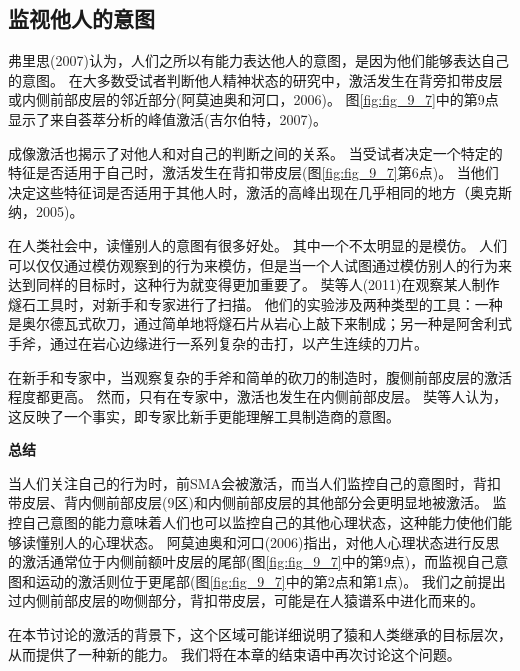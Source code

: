 \subsection{监视他人的意图}
\par
弗里思(2007)认为，人们之所以有能力表达他人的意图，是因为他们能够表达自己的意图。
在大多数受试者判断他人精神状态的研究中，激活发生在背旁扣带皮层或内侧前部皮层的邻近部分(阿莫迪奥和河口，2006)。
图\ref{fig:fig_9_7}中的第9点显示了来自荟萃分析的峰值激活(吉尔伯特，2007)。
\par


成像激活也揭示了对他人和对自己的判断之间的关系。
当受试者决定一个特定的特征是否适用于自己时，激活发生在背扣带皮层(图\ref{fig:fig_9_7}第6点)。
当他们决定这些特征词是否适用于其他人时，激活的高峰出现在几乎相同的地方（奥克斯纳，2005)。
\par


在人类社会中，读懂别人的意图有很多好处。
其中一个不太明显的是模仿。
人们可以仅仅通过模仿观察到的行为来模仿，但是当一个人试图通过模仿别人的行为来达到同样的目标时，这种行为就变得更加重要了。
奘等人(2011)在观察某人制作燧石工具时，对新手和专家进行了扫描。
他们的实验涉及两种类型的工具：一种是奥尔德瓦式砍刀，通过简单地将燧石片从岩心上敲下来制成；另一种是阿舍利式手斧，通过在岩心边缘进行一系列复杂的击打，以产生连续的刀片。
\par


在新手和专家中，当观察复杂的手斧和简单的砍刀的制造时，腹侧前部皮层的激活程度都更高。
然而，只有在专家中，激活也发生在内侧前部皮层。
奘等人认为，这反映了一个事实，即专家比新手更能理解工具制造商的意图。
\par


\textbf{总结}
\par

当人们关注自己的行为时，前SMA会被激活，而当人们监控自己的意图时，背扣带皮层、背内侧前部皮层(9区)和内侧前部皮层的其他部分会更明显地被激活。
监控自己意图的能力意味着人们也可以监控自己的其他心理状态，这种能力使他们能够读懂别人的心理状态。
阿莫迪奥和河口(2006)指出，对他人心理状态进行反思的激活通常位于内侧前额叶皮层的尾部(图\ref{fig:fig_9_7}中的第9点)，而监视自己意图和运动的激活则位于更尾部(图\ref{fig:fig_9_7}中的第2点和第1点)。
我们之前提出过内侧前部皮层的吻侧部分，背扣带皮层，可能是在人猿谱系中进化而来的。
\par


在本节讨论的激活的背景下，这个区域可能详细说明了猿和人类继承的目标层次，从而提供了一种新的能力。
我们将在本章的结束语中再次讨论这个问题。



